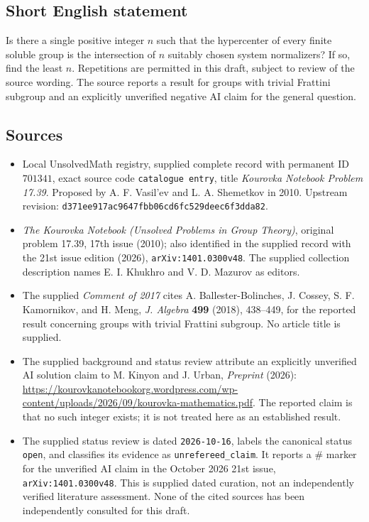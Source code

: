 \documentclass[11pt]{article}
\begin{document}
\subsection{Short English statement}
Is there a single positive integer \(n\) such that the hypercenter of every finite soluble group is the intersection of \(n\) suitably chosen system normalizers? If so, find the least \(n\). Repetitions are permitted in this draft, subject to review of the source wording. The source reports a result for groups with trivial Frattini subgroup and an explicitly unverified negative AI claim for the general question.
\subsection{Sources}
\begin{itemize}
\item Local UnsolvedMath registry, supplied complete record with permanent ID \(701341\), exact source code \texttt{catalogue entry}, title \emph{Kourovka Notebook Problem 17.39}. Proposed by A. F. Vasil'ev and L. A. Shemetkov in 2010. Upstream revision: \texttt{d371ee917ac9647fbb06cd6fc529deec6f3dda82}.
\item \emph{The Kourovka Notebook (Unsolved Problems in Group Theory)}, original problem 17.39, 17th issue (2010); also identified in the supplied record with the 21st issue edition (2026), \texttt{arXiv:1401.0300v48}. The supplied collection description names E. I. Khukhro and V. D. Mazurov as editors.
\item The supplied \emph{Comment of 2017} cites A. Ballester-Bolinches, J. Cossey, S. F. Kamornikov, and H. Meng, \emph{J. Algebra} \textbf{499} (2018), 438--449, for the reported result concerning groups with trivial Frattini subgroup. No article title is supplied.
\item The supplied background and status review attribute an explicitly unverified AI solution claim to M. Kinyon and J. Urban, \emph{Preprint} (2026): \url{https://kourovkanotebookorg.wordpress.com/wp-content/uploads/2026/09/kourovka-mathematics.pdf}. The reported claim is that no such integer exists; it is not treated here as an established result.
\item The supplied status review is dated \texttt{2026-10-16}, labels the canonical status \texttt{open}, and classifies its evidence as \texttt{unrefereed\_claim}. It reports a \# marker for the unverified AI claim in the October 2026 21st issue, \texttt{arXiv:1401.0300v48}. This is supplied dated curation, not an independently verified literature assessment. None of the cited sources has been independently consulted for this draft.
\end{itemize}
\end{document}
